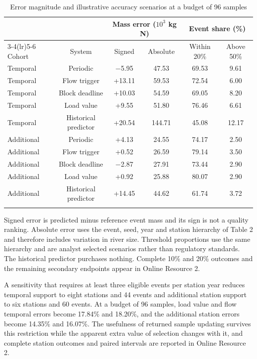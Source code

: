 \documentclass[pdflatex,sn-mathphys-num]{sn-jnl}%
\theoremstyle{thmstyleone}%
\theoremstyle{thmstyletwo}%
\theoremstyle{thmstylethree}%
\begin{document}
\begin{table}[htbp]
\caption{Error magnitude and illustrative accuracy scenarios at a budget of 96 samples}\label{tab:3}
\footnotesize
\setlength{\tabcolsep}{2pt}
\begin{tabular}{@{}lccccc@{}}
\toprule
& & \multicolumn{2}{c}{Mass error ($10^{3}$ kg N)} & \multicolumn{2}{c}{Event share (\%)} \\
\cmidrule(lr){3-4}\cmidrule(lr){5-6}
Cohort & System & Signed & Absolute & Within 20\% & Above 50\% \\
\midrule
Temporal & Periodic & $-$5.95 & 47.53 & 69.53 & 9.61\\
Temporal & Flow trigger & +13.11 & 59.53 & 72.54 & 6.00\\
Temporal & Block deadline & +10.03 & 54.59 & 69.05 & 8.20\\
Temporal & Load value & +9.55 & 51.80 & 76.46 & 6.61\\
Temporal & Historical predictor & +20.54 & 144.71 & 45.08 & 12.17\\
Additional & Periodic & +4.13 & 24.55 & 74.17 & 2.50\\
Additional & Flow trigger & +0.52 & 26.59 & 79.14 & 3.50\\
Additional & Block deadline & $-$2.87 & 27.91 & 73.44 & 2.90\\
Additional & Load value & +0.92 & 25.88 & 80.07 & 2.90\\
Additional & Historical predictor & +14.45 & 44.62 & 61.74 & 3.72\\
\botrule
\end{tabular}
\end{table}

Signed error is predicted minus reference event mass and its sign is not a quality ranking. Absolute error uses the event, seed, year and station hierarchy of Table 2 and therefore includes variation in river size. Threshold proportions use the same hierarchy and are analyst selected scenarios rather than regulatory standards. The historical predictor purchases nothing. Complete 10\% and 20\% outcomes and the remaining secondary endpoints appear in Online Resource 2.

A sensitivity that requires at least three eligible events per station year reduces temporal support to eight stations and 44 events and additional station support to six stations and 60 events. At a budget of 96 samples, load value and flow temporal errors become 17.84\% and 18.20\%, and the additional station errors become 14.35\% and 16.07\%. The usefulness of returned sample updating survives this restriction while the apparent extra value of selection changes with it, and complete station outcomes and paired intervals are reported in Online Resource 2.
\end{document}
